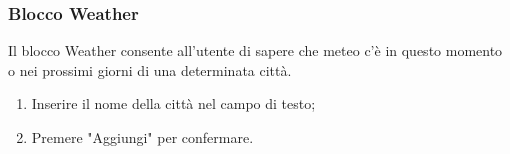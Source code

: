 \subsubsection{Blocco Weather}
Il blocco Weather consente all'utente di sapere che meteo c'è in questo momento o nei prossimi giorni di una determinata città.
\begin{enumerate}
	\item Inserire il nome della città nel campo di testo;
	\item Premere "Aggiungi" per confermare.

\end{enumerate}

